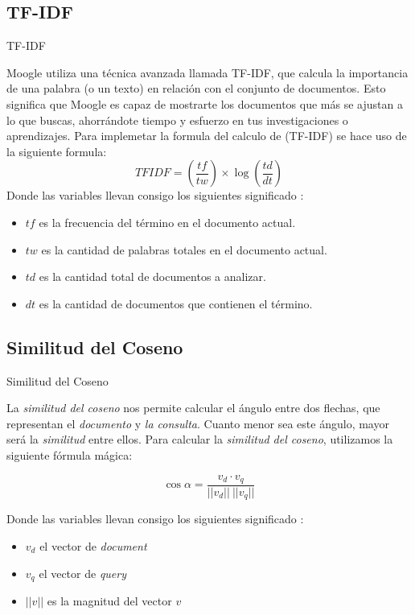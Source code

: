 \documentclass{beamer}
\begin{document}
\subsection*{TF-IDF}

\begin{frame}{TF-IDF}
    \begin{center}
        \large Moogle utiliza una técnica avanzada llamada TF-IDF, que calcula la importancia de una palabra (o un texto) en relación con el conjunto de documentos. Esto significa que Moogle es capaz de mostrarte los documentos que más se ajustan a lo que buscas, ahorrándote tiempo y esfuerzo en tus investigaciones o aprendizajes.
       \large Para implemetar la formula del calculo de {(TF-IDF)} se hace uso 
de la siguiente formula:
\begin{equation}
	TFIDF = (\frac{tf}{tw}) \times \log(\frac{td}{dt})
\end{equation}
Donde las variables llevan consigo los siguientes significado :
\begin{itemize}
	\item $tf$ es la frecuencia del término en el documento actual.
	\item $tw$ es la cantidad de palabras totales en el documento actual.
	\item $td$ es la cantidad total de documentos a analizar.
	\item $dt$ es la cantidad de documentos que contienen el término.
\end{itemize}
        
    \end{center}
\end{frame}

\subsection*{Similitud del Coseno}

\begin{frame}{Similitud del Coseno}
    \begin{center}
        \large La {\it similitud del coseno} nos permite calcular el ángulo entre dos flechas, que representan el {\it documento} y {\it la consulta}.
 Cuanto menor sea este ángulo, mayor será la {\it similitud} entre ellos. Para calcular la {\it similitud del coseno}, utilizamos la siguiente fórmula mágica:

\begin{equation}
	\cos \alpha = \frac{v_d \cdot v_q}{||v_d|| ~ ||v_q||}
\end{equation}

Donde las variables llevan consigo los siguientes significado :

\begin{itemize}
	\item $v_d$ el vector de {\it document}
	\item $v_q$ el vector de {\it query}
	\item $||v||$ es la magnitud del vector $v$
\end{itemize}
\end{center}
\end{frame}
\end{document}
